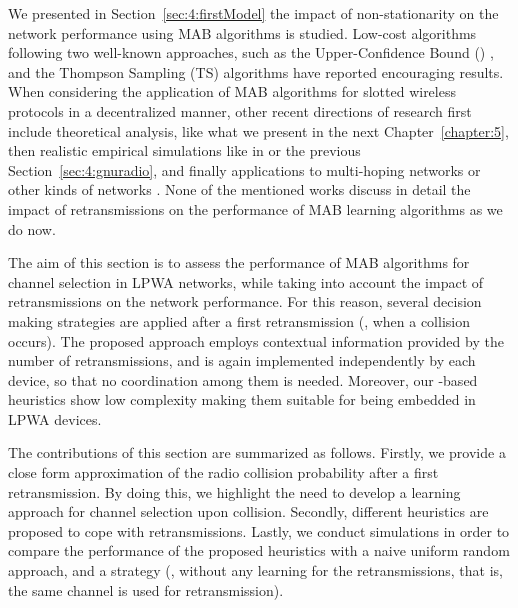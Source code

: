 We presented in Section~\ref{sec:4:firstModel} the impact of non-stationarity on the network performance using MAB algorithms is studied.
Low-cost algorithms following two well-known approaches, such as the Upper-Confidence Bound (\UCB{}) \cite{Auer02,Auer02}, and the Thompson Sampling (TS) algorithms \cite{Thompson33} have reported encouraging results.
When considering the application of MAB algorithms for slotted wireless protocols in a decentralized manner,
other recent directions of research first include theoretical analysis, like what we present in the next Chapter~\ref{chapter:5},
then realistic empirical simulations like in \cite{kumar2016two,kumar2017channel} or the previous Section~\ref{sec:4:gnuradio},
and finally applications to multi-hoping networks \cite{Mitton16,Toldov16} or other kinds of networks \cite{Wilhelmi19collaborative,Wilhelmi19potential}.
%
None of the mentioned works discuss in detail the impact of retransmissions on the performance of MAB learning algorithms as we do now.

The aim of this section is to assess the performance of MAB algorithms for channel selection in LPWA networks, while taking into account the impact of retransmissions on the network performance.
For this reason, several decision making strategies are applied after a first retransmission (\ie, when a collision occurs).
The proposed approach employs contextual information provided by the number of retransmissions, and is again implemented independently by each device, so that no coordination among them is needed.
Moreover, our \UCB{}-based heuristics show low complexity making them suitable for being embedded in LPWA devices.

The contributions of this section are summarized as follows.
	Firstly, we provide a close form approximation of the radio collision probability after a first retransmission.
	By doing this, we highlight the need to develop a learning approach for channel selection upon collision.
%
	Secondly, different heuristics are proposed to cope with retransmissions.
%
	Lastly, we conduct simulations in order to compare the performance of the proposed heuristics with a naive uniform random approach, and a \UCB{} strategy (\ie, without any learning for the retransmissions, that is, the same channel is used for retransmission).


